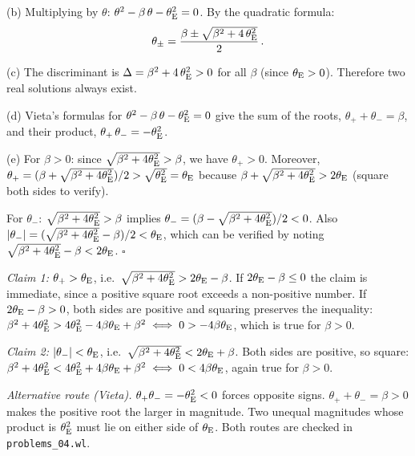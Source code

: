 (b) Multiplying by $\theta$:
$\theta^2 - \beta\,\theta - \theta_{\mathrm{E}}^2 = 0$.
By the quadratic formula:
\begin{equation*}
    \theta_\pm = \frac{\beta \pm \sqrt{\beta^2 + 4\,\theta_{\mathrm{E}}^2}}{2} \,.
\end{equation*}

(c) The discriminant is
$\Delta = \beta^2 + 4\,\theta_{\mathrm{E}}^2 > 0$ for all $\beta$ (since $\theta_{\mathrm{E}} > 0$).
Therefore two real solutions always exist.

(d) Vieta's formulas for $\theta^2 - \beta\,\theta - \theta_{\mathrm{E}}^2 = 0$
give the sum of the roots, $\theta_+ + \theta_- = \beta$, and their
product, $\theta_+\,\theta_- = -\theta_{\mathrm{E}}^2$. \checkmark

(e) For $\beta > 0$: since $\sqrt{\beta^2 + 4\theta_{\mathrm{E}}^2} > \beta$,
we have $\theta_+ > 0$.  Moreover,
$\theta_+ = (\beta + \sqrt{\beta^2 + 4\theta_{\mathrm{E}}^2})/2 > \sqrt{\theta_{\mathrm{E}}^2} = \theta_{\mathrm{E}}$
because $\beta + \sqrt{\beta^2 + 4\theta_{\mathrm{E}}^2} > 2\theta_{\mathrm{E}}$ (square both
sides to verify).

For $\theta_-$: $\sqrt{\beta^2 + 4\theta_{\mathrm{E}}^2} > \beta$ implies
$\theta_- = (\beta - \sqrt{\beta^2 + 4\theta_{\mathrm{E}}^2})/2 < 0$.
Also $|\theta_-| = (\sqrt{\beta^2 + 4\theta_{\mathrm{E}}^2} - \beta)/2 < \theta_{\mathrm{E}}$,
which can be verified by noting $\sqrt{\beta^2 + 4\theta_{\mathrm{E}}^2} - \beta < 2\theta_{\mathrm{E}}$.
\hfill $\square$
\begin{derivation}
\emph{Claim 1: $\theta_+ > \theta_{\mathrm{E}}$}, i.e.\
$\sqrt{\beta^2 + 4\theta_{\mathrm{E}}^2} > 2\theta_{\mathrm{E}} - \beta$.
If $2\theta_{\mathrm{E}} - \beta \le 0$ the claim is immediate, since a positive square root
exceeds a non-positive number. If $2\theta_{\mathrm{E}} - \beta > 0$, both sides are
positive and squaring preserves the inequality:
$\beta^2 + 4\theta_{\mathrm{E}}^2 > 4\theta_{\mathrm{E}}^2 - 4\beta\theta_{\mathrm{E}} + \beta^2
\iff 0 > -4\beta\theta_{\mathrm{E}}$, which is true for $\beta > 0$.

\emph{Claim 2: $|\theta_-| < \theta_{\mathrm{E}}$}, i.e.\
$\sqrt{\beta^2 + 4\theta_{\mathrm{E}}^2} < 2\theta_{\mathrm{E}} + \beta$. Both sides are positive, so
square: $\beta^2 + 4\theta_{\mathrm{E}}^2 < 4\theta_{\mathrm{E}}^2 + 4\beta\theta_{\mathrm{E}} + \beta^2
\iff 0 < 4\beta\theta_{\mathrm{E}}$, again true for $\beta > 0$.

\emph{Alternative route (Vieta).} $\theta_+\theta_- = -\theta_{\mathrm{E}}^2 < 0$ forces
opposite signs. $\theta_+ + \theta_- = \beta > 0$ makes the positive root the
larger in magnitude. Two unequal magnitudes whose product is $\theta_{\mathrm{E}}^2$
must lie on either side of $\theta_{\mathrm{E}}$. Both routes are checked in
\texttt{problems\_04.wl}.
\end{derivation}

